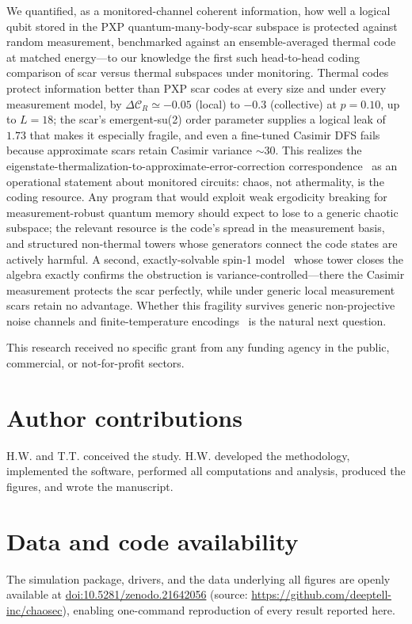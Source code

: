 \documentclass[aps,prxquantum,twocolumn,superscriptaddress,floatfix,longbibliography]{revtex4-2}
\newcommand{\CR}{\mathcal{C}_R}
\begin{document}
We quantified, as a monitored-channel coherent information, how well a logical
qubit stored in the PXP quantum-many-body-scar subspace is protected against
random measurement, benchmarked against an ensemble-averaged thermal code at
matched energy---to our knowledge the first such head-to-head coding comparison
of scar versus thermal subspaces under monitoring.
Thermal codes protect information better than PXP scar codes at every size and
under every measurement model, by $\Delta\CR\simeq-0.05$ (local) to $-0.3$
(collective) at $p=0.10$, up to $L=18$; the scar's emergent-su(2) order parameter supplies a
logical leak of $1.73$ that makes it especially fragile, and even a fine-tuned Casimir DFS
fails because approximate scars retain Casimir variance $\sim\!30$.
This realizes the eigenstate-thermalization-to-approximate-error-correction
correspondence~\cite{Brandao2019,BaoCheng2019,Qasim2025} as an operational statement about monitored
circuits: chaos, not athermality, is the coding resource.
Any program that would exploit weak ergodicity breaking for measurement-robust
quantum memory should expect to lose to a generic chaotic subspace; the relevant
resource is the code's spread in the measurement basis, and structured
non-thermal towers whose generators connect the code states are actively
harmful.
A second, exactly-solvable spin-1 model~\cite{Schecter2019} whose tower closes
the algebra exactly confirms the obstruction is variance-controlled---there the
Casimir measurement protects the scar perfectly, while under generic local
measurement scars retain no advantage. Whether this fragility survives generic non-projective
noise channels and finite-temperature encodings~\cite{Moudgalya2018,Moudgalya2022}
is the natural next question.

\begin{acknowledgments}
This research received no specific grant from any funding agency in the
public, commercial, or not-for-profit sectors.
\end{acknowledgments}

\section*{Author contributions}
H.W. and T.T. conceived the study. H.W. developed the methodology, implemented
the software, performed all computations and analysis, produced the figures,
and wrote the manuscript.

\section*{Data and code availability}
The simulation package, drivers, and the data underlying all figures are openly
available at \href{https://doi.org/10.5281/zenodo.21642056}{doi:10.5281/zenodo.21642056}
(source: \url{https://github.com/deeptell-inc/chaosec}), enabling one-command
reproduction of every result reported here.

 
\end{document}
